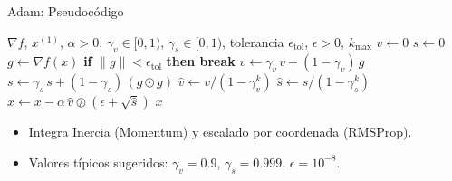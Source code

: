 \begin{frame}{Adam: Pseudocódigo}
    \scriptsize
    \begin{algorithmic}[1]
        \Require $\nabla f$, $x^{(1)}$, $\alpha > 0$, $\gamma_v \in [0,1)$, $\gamma_s \in [0,1)$, tolerancia $\epsilon_{\text{tol}}$, $\epsilon > 0$, $k_{\max}$
        \State $v \gets 0$
        \State $s \gets 0$
            \State $g \gets \nabla f(x)$
            \State \textbf{if} $\lVert g \rVert < \epsilon_{\text{tol}}$ \textbf{then break}
            \State $v \gets \gamma_v\, v + (1 - \gamma_v)\, g$ 
            \State $s \gets \gamma_s\, s + (1 - \gamma_s)\,(g \odot g)$ 
            \State $\hat{v} \gets v / (1 - \gamma_v^k)$ 
            \State $\hat{s} \gets s / (1 - \gamma_s^k)$ 
            \State $x \gets x - \alpha\,\hat{v} \oslash (\epsilon + \sqrt{\hat{s}})$ 
        \EndFor
        \State \Return $x$
    \end{algorithmic}

    \vspace{1em}
    \small
    \begin{itemize}
        \item Integra Inercia (Momentum) y escalado por coordenada (RMSProp).
        \item Valores típicos sugeridos: $\gamma_v=0.9$, $\gamma_s=0.999$, $\epsilon=10^{-8}$.
    \end{itemize}
\end{frame}

